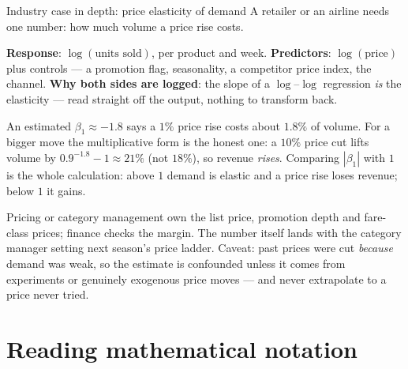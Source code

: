 \documentclass[aspectratio=169,11pt]{beamer}
\begin{document}
\begin{frame}{Industry case in depth: price elasticity of demand}
  \footnotesize
  A retailer or an airline needs one number: how much volume a price rise costs.
  \vspace{-6pt}
  \begin{industry}
    \textbf{Response}: $\log(\text{units sold})$, per product and week.
    \textbf{Predictors}: $\log(\text{price})$ plus controls --- a promotion
    flag, seasonality, a competitor price index, the channel.
    \textbf{Why both sides are logged}: the slope of a $\log$--$\log$
    regression \emph{is} the elasticity --- read straight off the output,
    nothing to transform back.
  \end{industry}
  \vspace{-6pt}
  \begin{numexample}[Illustrative]
    An estimated $\beta_1 \approx -1.8$ says a $1\%$ price rise costs about
    $1.8\%$ of volume. For a bigger move the multiplicative form is the honest
    one: a $10\%$ price cut lifts volume by $0.9^{-1.8}-1 \approx 21\%$ (not
    $18\%$), so revenue \emph{rises}. Comparing $|\beta_1|$ with $1$ is the
    whole calculation: above $1$ demand is elastic and a price rise loses
    revenue; below $1$ it gains.
  \end{numexample}
  \vspace{-6pt}
  \begin{takeaway}
    Pricing or category management own the list price, promotion depth and
    fare-class prices; finance checks the margin. The number itself lands with
    the category manager setting next season's price ladder. Caveat: past prices were cut
    \emph{because} demand was weak, so the estimate is confounded unless it
    comes from experiments or genuinely exogenous price moves --- and never
    extrapolate to a price never tried.
  \end{takeaway}
\end{frame}


\section{Reading mathematical notation}
\end{document}
